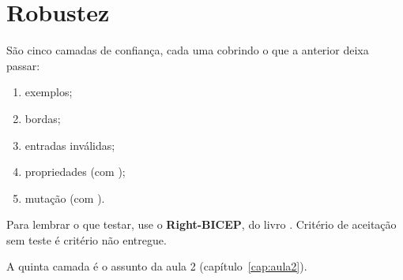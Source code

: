 \section{Robustez}

São cinco camadas de confiança, cada uma cobrindo o que a anterior deixa
passar:

\begin{enumerate}
\item exemplos;
\item bordas;
\item entradas inválidas;
\item propriedades (com );
\item mutação (com ).
\end{enumerate}

Para lembrar o que testar, use o \textbf{Right-BICEP}, do livro
. Critério de aceitação sem teste é critério não
entregue.

A quinta camada é o assunto da aula 2 (capítulo~\ref{cap:aula2}).
